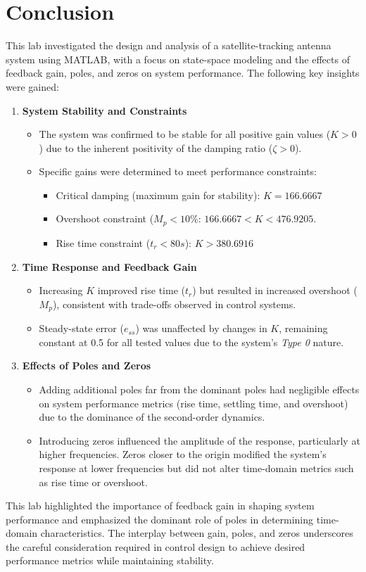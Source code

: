 \documentclass[a4paper, 12pt, english]{article}
\begin{document}
\section{Conclusion}
This lab investigated the design and analysis of a satellite-tracking antenna system using MATLAB, with a focus on state-space modeling and the effects of feedback gain, poles, and zeros on system performance. The following key insights were gained:
\begin{enumerate}
    \item \textbf{System Stability and Constraints}
    \begin{itemize}
        \item The system was confirmed to be stable for all positive gain values ($ {K} > {0} $) due to the inherent positivity of the damping ratio ($ {\zeta} > {0} $).
        \item Specific gains were determined to meet performance constraints:
        \begin{itemize}
            \item Critical damping (maximum gain for stability): $ {K} = {166.6667}$
            \item Overshoot constraint ($ {{M}_{p}} < {10\%} $: $ {166.6667} < {K} < {476.9205} $.
            \item Rise time constraint ($ {{t}_{r}} < {80s} $): $ {K} > {380.6916} $
        \end{itemize}
    \end{itemize}
    \item \textbf{Time Response and Feedback Gain}
    \begin{itemize}
        \item Increasing $K$ improved rise time ($ {{t}_{r}} $) but resulted in increased overshoot ($ {{M}_{p}} $), consistent with trade-offs observed in control systems.
        \item Steady-state error ($ {{e}_{ss}} $) was unaffected by changes in $K$, remaining constant at 0.5 for all tested values due to the system’s \textit{Type 0} nature.
    \end{itemize}
    \item \textbf{Effects of Poles and Zeros}
    \begin{itemize}
        \item Adding additional poles far from the dominant poles had negligible effects on system performance metrics (rise time, settling time, and overshoot) due to the dominance of the second-order dynamics.
        \item Introducing zeros influenced the amplitude of the response, particularly at higher frequencies. Zeros closer to the origin modified the system's response at lower frequencies but did not alter time-domain metrics such as rise time or overshoot.
    \end{itemize}
\end{enumerate}

\noindent
This lab highlighted the importance of feedback gain in shaping system performance and emphasized the dominant role of poles in determining time-domain characteristics. The interplay between gain, poles, and zeros underscores the careful consideration required in control design to achieve desired performance metrics while maintaining stability.
\end{document}
